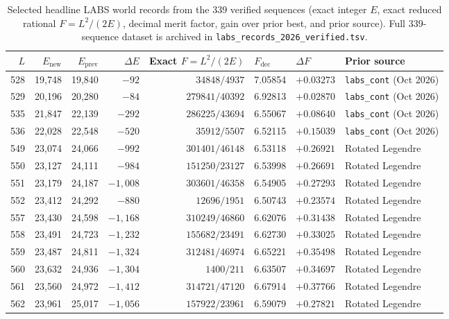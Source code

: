 \documentclass[10.5pt,letterpaper]{article}
\begin{document}
\begin{table}[t]
\centering
\caption{Selected headline LABS world records from the 339 verified sequences (exact integer $E$, exact reduced rational $F = L^2/(2E)$, decimal merit factor, gain over prior best, and prior source). Full 339-sequence dataset is archived in \texttt{labs\_records\_2026\_verified.tsv}.}
\label{tab:records}
\footnotesize
\setlength{\tabcolsep}{4.5pt}
\begin{tabular}{rrrrrlll}
\toprule
$L$ & $E_{\text{new}}$ & $E_{\text{prev}}$ & $\Delta E$ & Exact $F = L^2/(2E)$ & $F_{\text{dec}}$ & $\Delta F$ & Prior source \\
\midrule
528 & 19,748 & 19,840 & $-92$ & $34848/4937$ & 7.05854 & $+0.03273$ & \texttt{labs\_cont} (Oct 2026) \\
529 & 20,196 & 20,280 & $-84$ & $279841/40392$ & 6.92813 & $+0.02870$ & \texttt{labs\_cont} (Oct 2026) \\
535 & 21,847 & 22,139 & $-292$ & $286225/43694$ & 6.55067 & $+0.08640$ & \texttt{labs\_cont} (Oct 2026) \\
536 & 22,028 & 22,548 & $-520$ & $35912/5507$ & 6.52115 & $+0.15039$ & \texttt{labs\_cont} (Oct 2026) \\
549 & 23,074 & 24,066 & $-992$ & $301401/46148$ & 6.53118 & $+0.26921$ & Rotated Legendre \\
550 & 23,127 & 24,111 & $-984$ & $151250/23127$ & 6.53998 & $+0.26691$ & Rotated Legendre \\
551 & 23,179 & 24,187 & $-1{,}008$ & $303601/46358$ & 6.54905 & $+0.27293$ & Rotated Legendre \\
552 & 23,412 & 24,292 & $-880$ & $12696/1951$ & 6.50743 & $+0.23574$ & Rotated Legendre \\
557 & 23,430 & 24,598 & $-1{,}168$ & $310249/46860$ & 6.62076 & $+0.31438$ & Rotated Legendre \\
558 & 23,491 & 24,723 & $-1{,}232$ & $155682/23491$ & 6.62730 & $+0.33025$ & Rotated Legendre \\
559 & 23,487 & 24,811 & $-1{,}324$ & $312481/46974$ & 6.65221 & $+0.35498$ & Rotated Legendre \\
560 & 23,632 & 24,936 & $-1{,}304$ & $1400/211$ & 6.63507 & $+0.34697$ & Rotated Legendre \\
561 & 23,560 & 24,972 & $-1{,}412$ & $314721/47120$ & 6.67914 & $+0.37766$ & Rotated Legendre \\
562 & 23,961 & 25,017 & $-1{,}056$ & $157922/23961$ & 6.59079 & $+0.27821$ & Rotated Legendre \\

\end{tabular}
\end{table}
\end{document}
